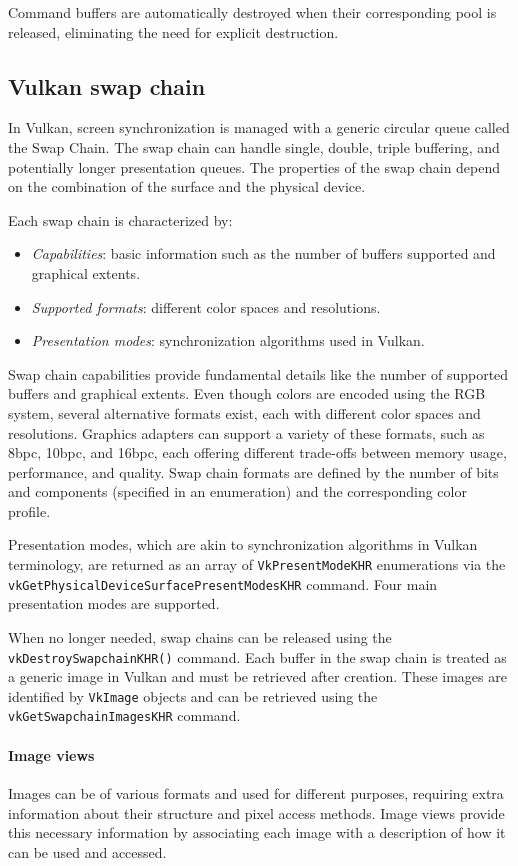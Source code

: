 Command buffers are automatically destroyed when their corresponding pool is released, eliminating the need for explicit destruction.

\subsection{Vulkan swap chain}
In Vulkan, screen synchronization is managed with a generic circular queue called the Swap Chain. 
The swap chain can handle single, double, triple buffering, and potentially longer presentation queues. 
The properties of the swap chain depend on the combination of the surface and the physical device.

Each swap chain is characterized by:
\begin{itemize}
    \item \textit{Capabilities}: basic information such as the number of buffers supported and graphical extents.
    \item \textit{Supported formats}: different color spaces and resolutions.
    \item \textit{Presentation modes}: synchronization algorithms used in Vulkan.
\end{itemize}

Swap chain capabilities provide fundamental details like the number of supported buffers and graphical extents. 
Even though colors are encoded using the RGB system, several alternative formats exist, each with different color spaces and resolutions. 
Graphics adapters can support a variety of these formats, such as 8bpc, 10bpc, and 16bpc, each offering different trade-offs between memory usage, performance, and quality. 
Swap chain formats are defined by the number of bits and components (specified in an enumeration) and the corresponding color profile.

Presentation modes, which are akin to synchronization algorithms in Vulkan terminology, are returned as an array of \texttt{VkPresentModeKHR} enumerations via the \texttt{vkGetPhysicalDeviceSurfacePresentModesKHR} command. 
Four main presentation modes are supported.

When no longer needed, swap chains can be released using the \texttt{vkDestroySwapchainKHR()} command. 
Each buffer in the swap chain is treated as a generic image in Vulkan and must be retrieved after creation.
 These images are identified by \texttt{VkImage} objects and can be retrieved using the \texttt{vkGetSwapchainImagesKHR} command.

\paragraph*{Image views}
Images can be of various formats and used for different purposes, requiring extra information about their structure and pixel access methods. 
Image views provide this necessary information by associating each image with a description of how it can be used and accessed.


